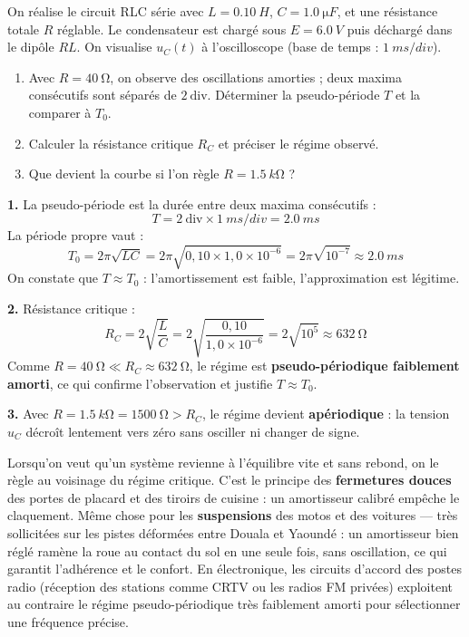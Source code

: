\documentclass[11pt]{article}
\begin{document}
\begin{exoresolu}
On réalise le circuit RLC série avec $L = \SI{0,10}{H}$, $C = \SI{1,0}{\micro F}$, et une résistance totale $R$ réglable. Le condensateur est chargé sous $E = \SI{6,0}{V}$ puis déchargé dans le dipôle $RL$. On visualise $u_C(t)$ à l'oscilloscope (base de temps : $\SI{1}{ms/div}$).
\begin{enumerate}
\item Avec $R = \SI{40}{\ohm}$, on observe des oscillations amorties ; deux maxima consécutifs sont séparés de $2\ \text{div}$. Déterminer la pseudo-période $T$ et la comparer à $T_0$.
\item Calculer la résistance critique $R_C$ et préciser le régime observé.
\item Que devient la courbe si l'on règle $R = \SI{1,5}{k\ohm}$ ?
\end{enumerate}
\tcblower
\textbf{1.} La pseudo-période est la durée entre deux maxima consécutifs :
\[ T = 2\ \text{div} \times \SI{1}{ms/div} = \SI{2,0}{ms} \]
La période propre vaut :
\[ T_0 = 2\pi\sqrt{LC} = 2\pi\sqrt{0{,}10\times 1{,}0\times 10^{-6}} = 2\pi\sqrt{10^{-7}} \approx \SI{2,0}{ms} \]
On constate que $T \approx T_0$ : l'amortissement est faible, l'approximation est légitime.

\textbf{2.} Résistance critique :
\[ R_C = 2\sqrt{\frac{L}{C}} = 2\sqrt{\frac{0{,}10}{1{,}0\times 10^{-6}}} = 2\sqrt{10^{5}} \approx \SI{632}{\ohm} \]
Comme $R = \SI{40}{\ohm} \ll R_C \approx \SI{632}{\ohm}$, le régime est \textbf{pseudo-périodique faiblement amorti}, ce qui confirme l'observation et justifie $T \approx T_0$.

\textbf{3.} Avec $R = \SI{1,5}{k\ohm} = \SI{1500}{\ohm} > R_C$, le régime devient \textbf{apériodique} : la tension $u_C$ décroît lentement vers zéro sans osciller ni changer de signe.
\end{exoresolu}

\begin{savaistu}
Lorsqu'on veut qu'un système revienne à l'équilibre vite et sans rebond, on le règle au voisinage du régime critique. C'est le principe des \textbf{fermetures douces} des portes de placard et des tiroirs de cuisine : un amortisseur calibré empêche le claquement. Même chose pour les \textbf{suspensions} des motos et des voitures — très sollicitées sur les pistes déformées entre Douala et Yaoundé : un amortisseur bien réglé ramène la roue au contact du sol en une seule fois, sans oscillation, ce qui garantit l'adhérence et le confort. En électronique, les circuits d'accord des postes radio (réception des stations comme CRTV ou les radios FM privées) exploitent au contraire le régime pseudo-périodique très faiblement amorti pour sélectionner une fréquence précise.
\end{savaistu}
\end{document}
